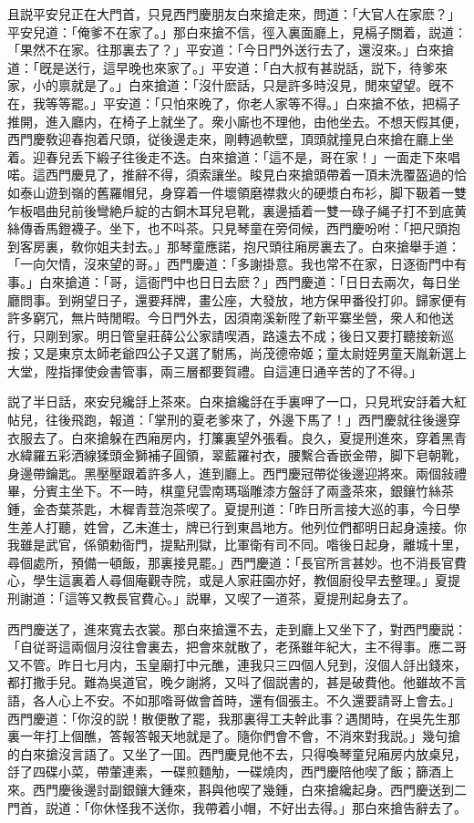 且説平安兒正在大門首，只見西門慶朋友白來搶走來，問道：「大官人在家麽？」平安兒道：「俺爹不在家了。」那白來搶不信，徑入裏面廳上，見槅子關着，説道：「果然不在家。往那裏去了？」平安道：「今日門外送行去了，還沒來。」白來搶道：「旣是送行，這早晚也來家了。」平安道：「白大叔有甚説話，説下，待爹來家，小的禀就是了。」白來搶道：「沒什麽話，只是許多時沒見，閒來望望。旣不在，我等等罷。」平安道：「只怕來晚了，你老人家等不得。」白來搶不依，把槅子推開，進入廳内，在椅子上就坐了。衆小廝也不理他，由他坐去。不想天假其便，西門慶敎迎春抱着尺頭，従後邊走來，剛轉過軟壁，頂頭就撞見白來搶在廳上坐着。迎春兒丢下緞子往後走不迭。白來搶道：「這不是，哥在家！」一面走下來唱喏。這西門慶見了，推辭不得，須索讓坐。睃見白來搶頭帶着一頂未洗覆盔過的恰如泰山遊到嶺的舊羅帽兒，身穿着一件壞領磨襟救火的硬漿白布衫，脚下靸着一雙乍板唱曲兒前後彎絶戶綻的古銅木耳兒皂靴，裏邊插着一雙一碌子䋲子打不到底黄絲傳香馬鐙襪子。坐下，也不呌茶。只見琴童在旁伺候，西門慶吩咐：「把尺頭抱到客房裏，敎你姐夫封去。」那琴童應諾，抱尺頭往廂房裏去了。白來搶舉手道：「一向欠情，沒來望的哥。」西門慶道：「多謝掛意。我也常不在家，日逐衙門中有事。」白來搶道：「哥，這衙門中也日日去麽？」西門慶道：「日日去兩次，每日坐廳問事。到朔望日子，還要拜牌，畫公座，大發放，地方保甲番役打卯。歸家便有許多窮冗，無片時閒暇。今日門外去，因須南溪新陞了新平寨坐營，衆人和他送行，只剛到家。明日管皇莊薛公公家請喫酒，路遠去不成；後日又要打聽接新巡按；又是東京太師老爺四公子又選了駙馬，尚茂德帝姬；童太尉姪男童天胤新選上大堂，陞指揮使僉書管事，兩三層都要賀禮。自這連日通辛苦的了不得。」

説了半日話，來安兒纔㧱上茶來。白來搶纔㧱在手裏呷了一口，只見玳安㧱着大紅帖兒，往後飛跑，報道：「掌刑的夏老爹來了，外邊下馬了！」西門慶就往後邊穿衣服去了。白來搶躲在西廂房内，打簾裏望外張看。良久，夏提刑進來，穿着黑青水緯羅五彩洒線猱頭金獅補子圓領，翠藍羅衬衣，腰繫合香嵌金帶，脚下皂朝靴，身邊帶鑰匙。黑壓壓跟着許多人，進到廳上。西門慶冠帶從後邊迎將來。兩個敍禮畢，分賓主坐下。不一時，棋童兒雲南瑪瑙雕漆方盤㧱了兩盞茶來，銀鑲竹絲茶鍾，金杏葉茶匙，木樨青荳泡茶喫了。夏提刑道：「昨日所言接大巡的事，今日學生差人打聽，姓曾，乙未進士，牌已行到東昌地方。他列位們都明日起身遠接。你我雖是武官，係領勅衙門，提點刑獄，比軍衛有司不同。喒後日起身，離城十里，尋個處所，預備一頓飯，那裏接見罷。」西門慶道：「長官所言甚妙。也不消長官費心，學生這裏着人尋個庵觀寺院，或是人家莊園亦好，教個廚役早去整理。」夏提刑謝道：「這等又教長官費心。」説畢，又喫了一道茶，夏提刑起身去了。

西門慶送了，進來寬去衣裳。那白來搶還不去，走到廳上又坐下了，對西門慶説：「自従哥這兩個月沒往會裏去，把會來就散了，老孫雖年紀大，主不得事。應二哥又不管。昨日七月内，玉皇廟打中元醮，連我只三四個人兒到，沒個人㧱出錢來，都打撒手兒。難為吳道官，晚夕謝將，又呌了個説書的，甚是破費他。他雖故不言語，各人心上不安。不如那喒哥做會首時，還有個張主。不久還要請哥上會去。」西門慶道：「你沒的説！散便散了罷，我那裏得工夫幹此事？遇閒時，在吳先生那裏一年打上個醮，答報答報天地就是了。隨你們會不會，不消來對我説。」幾句搶的白來搶沒言語了。又坐了一囬。西門慶見他不去，只得喚琴童兒廂房内放桌兒，㧱了四碟小菜，帶葷連素，一碟煎麵觔，一碟燒肉，西門慶陪他喫了飯；篩酒上來。西門慶後邊討副銀鑲大鍾來，斟與他喫了幾鍾，白來搶纔起身。西門慶送到二門首，説道：「你休怪我不送你，我帶着小帽，不好出去得。」那白來搶告辭去了。

